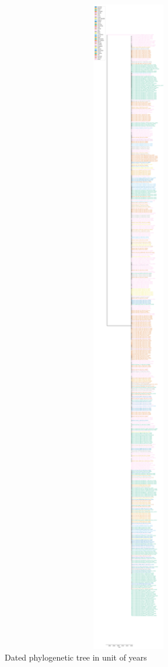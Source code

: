 \documentclass{article}
\begin{document}
\begin{figure}[h]
\centering
\includegraphics[width=1\textwidth,height=1\textheight,keepaspectratio]{./figs/tree_time.pdf}
\caption{Dated phylogenetic tree in unit of years}
\end{figure}
\end{document}
